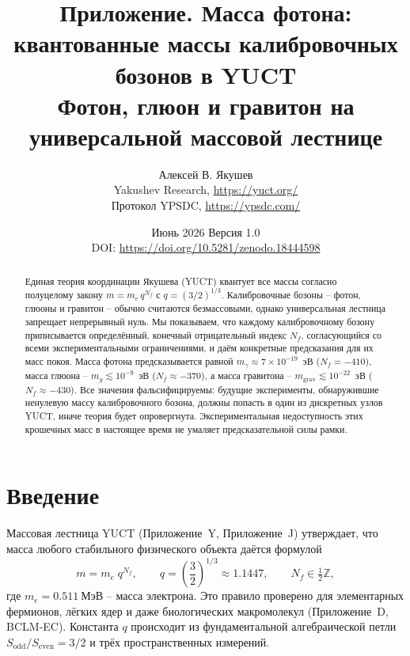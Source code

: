 \documentclass[11pt,a4paper]{article}
\begin{document}
	
	\title{\Huge\textbf{Приложение. Масса фотона: квантованные массы калибровочных бозонов в YUCT}\\[0.3cm]
		\Large Фотон, глюон и гравитон на универсальной массовой лестнице}
	
	\author{Алексей В. Якушев \\ 
		Yakushev Research, \url{https://yuct.org/} \\ 
		Протокол YPSDC, \url{https://ypsdc.com/}}
	
	\date{Июнь 2026 \quad Версия 1.0 \\ \medskip
		DOI: \url{https://doi.org/10.5281/zenodo.18444598}}
	
	\maketitle
	
	\begin{abstract}
		Единая теория координации Якушева (YUCT) квантует все массы согласно полуцелому закону
		$m = m_e \, q^{N_f}$ с $q = (3/2)^{1/3}$. Калибровочные бозоны – фотон, глюоны и гравитон –
		обычно считаются безмассовыми, однако универсальная лестница запрещает непрерывный нуль.
		Мы показываем, что каждому калибровочному бозону приписывается определённый, конечный отрицательный
		индекс $N_f$, согласующийся со всеми экспериментальными ограничениями, и даём конкретные предсказания
		для их масс покоя. Масса фотона предсказывается равной $m_\gamma \approx 7\times 10^{-19}$~эВ
		($N_f = -410$), масса глюона – $m_g \lesssim 10^{-9}$~эВ ($N_f \approx -370$), а масса гравитона –
		$m_{\mathrm{grav}} \lesssim 10^{-22}$~эВ ($N_f \approx -430$). Все значения фальсифицируемы:
		будущие эксперименты, обнаружившие ненулевую массу калибровочного бозона, должны попасть в один
		из дискретных узлов YUCT, иначе теория будет опровергнута. Экспериментальная недоступность этих
		крошечных масс в настоящее время не умаляет предсказательной силы рамки.
	\end{abstract}
	
	\newpage
	\tableofcontents
	\newpage
	
	\section{Введение}
	
	Массовая лестница YUCT (Приложение~Y, Приложение~J) утверждает, что масса любого стабильного физического объекта даётся формулой
	\begin{equation}\label{eq:massladder}
		m = m_e \; q^{N_f}, \qquad q = \left(\frac{3}{2}\right)^{\!1/3} \approx 1.1447,
		\qquad N_f \in \tfrac12\mathbb{Z},
	\end{equation}
	где $m_e = 0.511~\mathrm{МэВ}$ – масса электрона. Это правило проверено для элементарных фермионов,
	лёгких ядер и даже биологических макромолекул (Приложение~D, BCLM‑EC). Константа $q$ происходит из
	фундаментальной алгебраической петли $S_{\mathrm{odd}}/S_{\mathrm{even}} = 3/2$ и трёх пространственных измерений.
	
\end{document}

